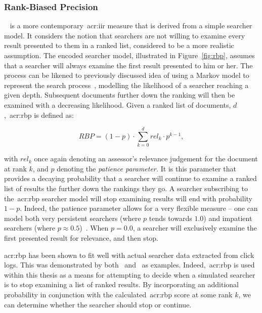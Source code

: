 \subsubsection{Rank-Biased Precision}\label{sec:ir_background:evaluation:system:rbp}
~\citep{moffat2008rbp} is a more contemporary~\gls{acr:iir} measure that is derived from a simple searcher model. It considers the notion that searchers are not willing to examine every result presented to them in a ranked list, considered to be a more realistic assumption. The encoded searcher model, illustrated in Figure~\ref{fig:rbp}, assumes that a searcher will always examine the first result presented to him or her. The process can be likened to previously discussed idea of using a Markov model to represent the search process~\cite{tran2017markov_models}, modelling the likelihood of a searcher reaching a given depth. Subsequent documents further down the ranking will then be examined with a decreasing likelihood. Given a ranked list of documents, $d$,~\gls{acr:rbp} is defined as:

\begin{equation*}
RBP = (1 - p) \cdot \sum_{k=0}^{d}rel_k \cdot p^{k-1},
\end{equation*}

with $rel_k$ once again denoting an assessor's relevance judgement for the document at rank $k$, and $p$ denoting the \emph{patience parameter.} It is this parameter that provides a decaying probability that a searcher will continue to examine a ranked list of results the further down the rankings they go. A searcher subscribing to the~\gls{acr:rbp} searcher model will stop examining results will end with probability $1-p$. Indeed, the patience parameter allows for a very flexible measure -- one can model both very persistent searchers (where $p$ tends towards $1.0$) and impatient searchers (where $p\approx0.5$)~\citep{moffat2008rbp}. When $p=0.0$, a searcher will exclusively examine the first presented result for relevance, and then stop.

\gls{acr:rbp} has been shown to fit well with actual searcher data extracted from click logs. This was demonstrated by both~\cite{chapelle2009rbp} and~\cite{zhang2010click_rbp} as examples. Indeed,~\gls{acr:rbp} is used within this thesis as a means for attempting to decide when a simulated searcher is to stop examining a list of ranked results. By incorporating an additional probability in conjunction with the calculated~\gls{acr:rbp} score at some rank $k$, we can determine whether the searcher should stop or continue.

